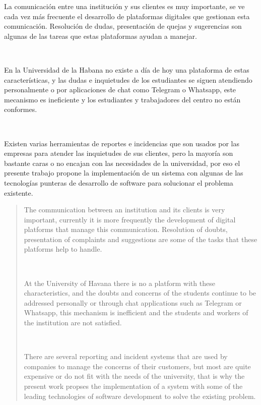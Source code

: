 \begin{resumen}
	La comunicación entre una institución y sus clientes es muy importante, se ve cada vez más frecuente el desarrollo de plataformas digitales que gestionan esta comunicación. Resolución de dudas, presentación de quejas y sugerencias son algunas de las tareas que estas plataformas ayudan a manejar.
	
	\mewline
	\
	
	En la Universidad de la Habana no existe a día de hoy una plataforma de estas características, y las dudas e inquietudes de los estudiantes se siguen atendiendo personalmente o por aplicaciones de chat como Telegram o Whatsapp, este mecanismo es ineficiente y los estudiantes y trabajadores del centro no están conformes.

	\newline
	\
	
	Existen varias herramientas de reportes e incidencias que son usados por las empresas para atender las inquietudes de sus clientes, pero la mayoría son bastante caras o no encajan con las necesidades de la universidad, por eso el presente trabajo propone la implementación de un sistema con algunas de las tecnologías punteras de desarrollo de software para solucionar el problema existente.
\end{resumen}

\begin{abstract}
	The communication between an institution and its clients is very important, currently it is more frequently the development of digital platforms that manage this communication. Resolution of doubts, presentation of complaints and suggestions are some
	of the tasks that these platforms help to handle.
	
	\newline
	\
	
	At the University of Havana there is no a platform with these characteristics, and the doubts and concerns of the students continue to be addressed
	personally or through chat applications such as Telegram or Whatsapp, this mechanism is inefficient and the students and workers of the institution are not satisfied.
	
	\newline
	\
	
	There are several reporting and incident systems that are used by companies to manage the concerns of their customers, but most are quite expensive
	or do not fit with the needs of the university, that is why the present work propses the implementation of a system with some of the leading technologies of
	software development to solve the existing problem.
\end{abstract}